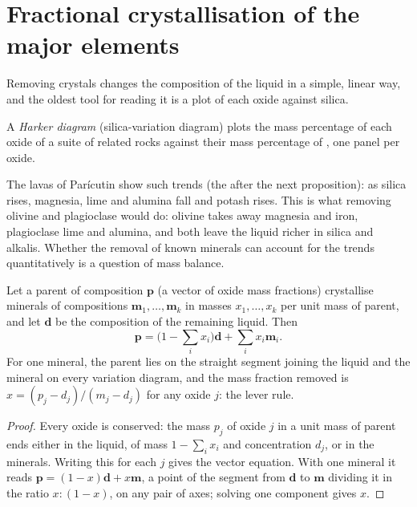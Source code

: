 \section{Fractional crystallisation of the major elements}\label{sec:b2:magmatic-differentiation:majors}

Removing crystals changes the composition of the liquid in a simple, linear way,
and the oldest tool for reading it is a plot of each oxide against silica.

\begin{definition}\label{def:b2:magmatic-differentiation:harker}
A \emph{Harker diagram} (silica-variation diagram) plots the
mass percentage of each oxide of a suite of related rocks against their mass
percentage of , one panel per oxide.
\end{definition}


The lavas of Parícutin show such trends (the  after the next
proposition): as silica rises, magnesia, lime and alumina fall and potash rises. This is
what removing olivine and plagioclase would do:
olivine takes away magnesia and iron, plagioclase lime and alumina, and both leave
the liquid richer in silica and alkalis. Whether the removal of known minerals can
account for the trends quantitatively is a question of mass balance.

\begin{proposition}\label{prop:b2:magmatic-differentiation:lever}
Let a parent  of composition $\mathbf p$ (a vector of oxide mass fractions)
crystallise minerals of compositions $\mathbf m_1, \dots, \mathbf m_k$ in masses
$x_1, \dots, x_k$ per unit mass of parent, and let $\mathbf d$ be the composition
of the remaining liquid. Then
\[
\mathbf p = \Big(1 - \sum_i x_i\Big)\mathbf d + \sum_i x_i \mathbf m_i .
\]
For one mineral, the parent lies on the straight segment joining the liquid and the
mineral on every variation diagram, and the mass fraction removed is
$x = (p_j - d_j)/(m_j - d_j)$ for any oxide $j$: the lever rule.
\end{proposition}

\begin{proof}
Every oxide is conserved: the mass $p_j$ of oxide $j$ in a unit mass of parent ends
either in the liquid, of mass $1 - \sum_i x_i$ and concentration $d_j$, or in the
minerals. Writing this for each $j$ gives the vector equation. With one mineral it
reads $\mathbf p = (1-x)\mathbf d + x\mathbf m$, a point of the segment from
$\mathbf d$ to $\mathbf m$ dividing it in the ratio $x : (1-x)$, on any pair of
axes; solving one component gives $x$.
\end{proof}

